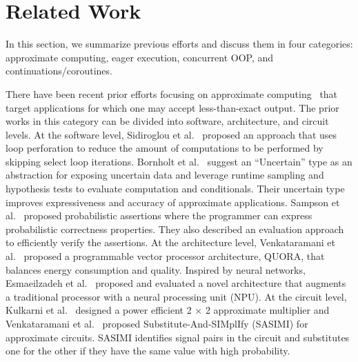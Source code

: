 
\section{Related Work}
\label{sec:related}
In this section, we summarize previous efforts and discuss them in four categories: 
approximate computing, eager execution, concurrent OOP, and continuations/coroutines.



 There have been recent prior efforts focusing on approximate computing~\cite{Baek:2010:GFS:1806596.1806620,Ringenburg:2015:MDQ:2694344.2694365,Ribic:2014:EWL:2541940.2541971,Schkufza:2014:SOF:2594291.2594302,Samadi:2014:PPA:2541940.2541948,Gupta:2014:GPE:2594291.2594306,Goiri:2015:ABA:2694344.2694351,Miguel:2014:LVA:2742155.2742169,Gehr:2018:BPI:3192366.3192400,Laurenzano:2016:IRU:2908080.2908087} that target applications for which one may accept less-than-exact output. The prior works in this category can be divided into software, architecture, and circuit levels. At the software level, Sidiroglou et al.~\cite{Sidiroglou11} proposed an approach that uses loop perforation to reduce the amount of computations to be performed by skipping select loop iterations. Bornholt et al.~\cite{Bornholt14} suggest an ``Uncertain'' type as an abstraction for exposing uncertain data and leverage runtime sampling and hypothesis tests to evaluate computation and conditionals. Their uncertain type improves expressiveness and accuracy of approximate applications. 
Sampson et al.~\cite{Sampson:2014:EVP:2594291.2594294} proposed probabilistic assertions where the programmer can express probabilistic correctness properties. They also described an evaluation approach to efficiently verify the assertions. 
At the architecture level, Venkataramani et al.~\cite{Venkataramani-MICRO-13} proposed a programmable vector processor architecture, QUORA, that balances energy consumption and quality. Inspired by neural networks, Esmaeilzadeh et al.~\cite{Esmaeilzadeh12} proposed and evaluated a novel architecture that augments a traditional processor with a neural processing unit (NPU). At the circuit level, Kulkarni et al.~\cite{Kulkarni11} designed a power efficient 2 $\times$ 2 approximate multiplier and Venkataramani et al.~\cite{Venkataramani-DATE-13} proposed Substitute-And-SIMplIfy (SASIMI) for approximate circuits. SASIMI identifies signal pairs in the circuit and substitutes one for the other if they have the same value with high probability.


